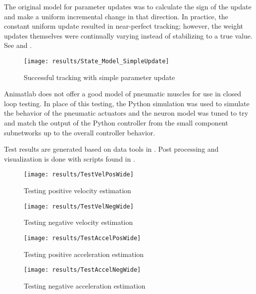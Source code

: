 
The original model for parameter updates was to calculate the sign of the update
and make a uniform incremental change in that direction. In practice, the constant uniform update
resulted in near-perfect tracking; however, the weight updates themselves were continually varying instead of stabilizing to a true value. See  and .

\begin{figure}
\centering
\texttt{[image: results/State\_Model\_SimpleUpdate]}
\caption{Successful tracking with simple parameter update}
\label{fig:StateUpdateSimple}
\end{figure}


Animatlab does not offer a good model of pneumatic muscles for use in closed loop testing. In place of this testing, the Python simulation was used to simulate the behavior of the pneumatic actuators and the neuron model was tuned to try and match the output of the Python controller from the small component subnetworks up to the overall controller behavior.


Test results are generated based on data tools in . Post processing and visualization is done with scripts found in .

\begin{figure}
\centering
\texttt{[image: results/TestVelPosWide]}
\caption{Testing positive velocity estimation}
\label{fig:TestVelPos}
\end{figure}

\begin{figure}
\centering
\texttt{[image: results/TestVelNegWide]}
\caption{Testing negative velocity estimation}
\label{fig:TestVelNeg}
\end{figure}

\begin{figure}
\centering
\texttt{[image: results/TestAccelPosWide]}
\caption{Testing positive acceleration estimation}
\label{fig:TestAccelPos}
\end{figure}

\begin{figure}
\centering
\texttt{[image: results/TestAccelNegWide]}
\caption{Testing negative acceleration estimation}
\label{fig:TestAccelNeg}
\end{figure}


